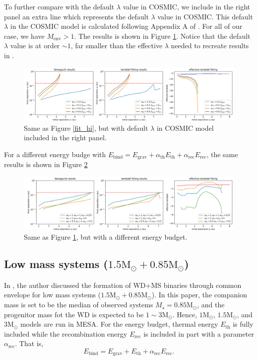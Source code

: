 \documentclass[12pt]{article}
\newcommand{\Msun}{\mathrm{M_{\odot}}}
\newcommand{\Mstar}{M_{\star}}
\newcommand{\alphath}{\alpha_{\mathrm{th}}}
\newcommand{\alpharec}{\alpha_{\mathrm{rec}}}
\newcommand{\Ebind}{E_{\mathrm{bind}}}
\newcommand{\Egrav}{E_{\mathrm{grav}}}
\newcommand{\Eth}{E_{\mathrm{th}}}
\newcommand{\Erec}{E_{\mathrm{rec}}}
\begin{document}
To further compare with the default $\lambda$ value in COSMIC, we include in the right panel an extra line which represents the default $\lambda$ value in COSMIC. This default $\lambda$ in the COSMIC model is calculated following Appendix A of \cite{claeys2014theoretical}. For all of our case, we have $M_{\mathrm{env}} > 1$. The results is shown in Figure \ref{fit_cmp_hi}. Notice that the default $\lambda$ value is at order $\sim 1$, far smaller than the effective $\lambda$ needed to recreate results in \cite{yamaguchi_hi}.

\begin{figure}
    \centering
    \includegraphics[width=\linewidth]{fig/7+1cmp.png}
    \caption{Same as Figure \ref{fit_hi}, but with default $\lambda$ in COSMIC model included in the right panel.}
    \label{fit_cmp_hi}
\end{figure}

For a different energy budge with $\Ebind = \Egrav + \alphath \Eth + \alpharec \Erec$, the same results is shown in Figure \ref{fit_cmp_eb_hi}

\begin{figure}
    \centering
    \includegraphics[width=\linewidth]{fig/7+1ebcmp.png}
    \caption{Same as Figure \ref{fit_cmp_hi}, but with a different energy budget.}
    \label{fit_cmp_eb_hi}
\end{figure}


\subsection{Low mass systems ($1.5\Msun + 0.85\Msun$)}

In \cite{yamaguchi_lo}, the author discussed the formation of WD+MS binaries through common envelope for low mass systems ($1.5\Msun + 0.85\Msun$). In this paper, the companion mass is set to be the median of observed systems $\Mstar = 0.85\Msun$, and the progenitor mass fot the WD is expected to be $1 \sim 3 \Msun$. Hence, $1\Msun$, $1.5\Msun$, and $3\Msun$ models are run in MESA. For the energy budget, thermal energy $\Eth$ is fully included while the recombination energy $\Erec$ is included in part with a parameter $\alpharec$. That is,
\[
    \Ebind = \Egrav + \Eth + \alpharec \Erec.
\]
 
\end{document}
